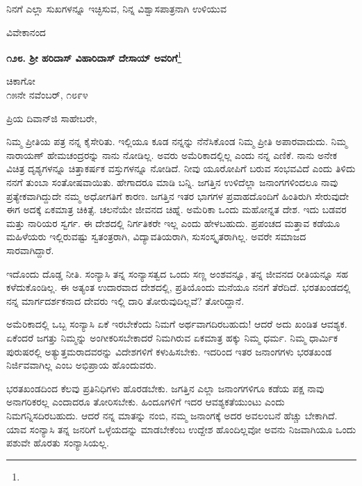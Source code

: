 \vspace{0.1cm}

ನಿನಗೆ ಎಲ್ಲಾ ಸುಖಗಳನ್ನೂ ಇಚ್ಛಿಸುವ, ನಿನ್ನ ವಿಶ್ವಾಸಪಾತ್ರನಾಗಿ ಉಳಿಯುವ

{\flushright
ವಿವೇಕಾನಂದ\par}

\eject

\begin{center}
\textbf{೧೨೮. ಶ‍್ರೀ ಹರಿದಾಸ್ ವಿಹಾರಿದಾಸ್ ದೇಸಾಯ್ ಅವರಿಗೆ}\footnote{}
\end{center}

\begin{flushright}
ಚಿಕಾಗೋ\\೧೫ನೇ ನವೆಂಬರ್, ೧೮೯೪
\end{flushright}

\noindent
ಪ್ರಿಯ ದಿವಾನ್‌ಜಿ ಸಾಹೇಬರೇ,

ನಿಮ್ಮ ಪ್ರೀತಿಯ ಪತ್ರ ನನ್ನ ಕೈಸೇರಿತು. ಇಲ್ಲಿಯೂ ಕೂಡ ನನ್ನನ್ನು ನೆನೆಸಿಕೊಂಡ ನಿಮ್ಮ ಪ್ರೀತಿ ಅಪಾರವಾದುದು. ನಿಮ್ಮ ನಾರಾಯಣ್ ಹೇಮಚಂದ್ರರನ್ನು ನಾನು ನೋಡಿಲ್ಲ. ಅವರು ಅಮೆರಿಕಾದಲ್ಲಿಲ್ಲ ಎಂದು ನನ್ನ ಎಣಿಕೆ. ನಾನು ಅನೇಕ ವಿಚಿತ್ರ ದೃಶ್ಯಗಳನ್ನೂ ಚಿತ್ತಾಕರ್ಷಕ ವಸ್ತುಗಳನ್ನೂ ನೋಡಿದೆ. ನೀವು ಯೂರೋಪಿಗೆ ಬರುವ ಸಂಭವವಿದೆ ಎಂದು ತಿಳಿದು ನನಗೆ ತುಂಬಾ ಸಂತೋಷವಾಯಿತು. ಹೇಗಾದರೂ ಮಾಡಿ ಬನ್ನಿ. ಜಗತ್ತಿನ ಉಳಿದೆಲ್ಲಾ ಜನಾಂಗಗಳಿಂದಲೂ ನಾವು ಪ್ರತ್ಯೇಕವಾಗಿದ್ದುದೇ ನಮ್ಮ ಅಧೋಗತಿಗೆ ಕಾರಣ. ಜಗತ್ತಿನ ಇತರ ಭಾಗಗಳ ಪ್ರವಾಹದೊಂದಿಗೆ ಹಿಂತಿರುಗಿ ಸೇರುವುದೇ ಈಗ ಅದಕ್ಕೆ ಏಕಮಾತ್ರ ಚಿಕಿತ್ಸೆ. ಚಲನೆಯೇ ಜೀವನದ ಚಿಹ್ನೆ. ಅಮೆರಿಕಾ ಒಂದು ಮಹೋನ್ನತ ದೇಶ. ಇದು ಬಡವರ ಮತ್ತು ನಾರಿಯರ ಸ್ವರ್ಗ. ಈ ದೇಶದಲ್ಲಿ ನಿರ್ಗತಿಕರೇ ಇಲ್ಲ ಎಂದು ಹೇಳಬಹುದು. ಪ್ರಪಂಚದ ಮತ್ತಾವ ಕಡೆಯೂ ಮಹಿಳೆಯರು ಇಲ್ಲಿರುವಷ್ಟು ಸ್ವತಂತ್ರರಾಗಿ, ವಿದ್ಯಾವತಿಯರಾಗಿ, ಸುಸಂಸ್ಕೃತರಾಗಿಲ್ಲ. ಅವರೇ ಸಮಾಜದ ಸಾರವಾಗಿದ್ದಾರೆ.

ಇದೊಂದು ದೊಡ್ಡ ನೀತಿ. ಸಂನ್ಯಾಸಿ ತನ್ನ ಸಂನ್ಯಾಸತ್ವದ ಒಂದು ಸಣ್ಣ ಅಂಶವನ್ನೂ, ತನ್ನ ಜೀವನದ ರೀತಿಯನ್ನೂ ಸಹ ಕಳೆದುಕೊಂಡಿಲ್ಲ. ಈ ಅತ್ಯಂತ ಉದಾರವಾದ ದೇಶದಲ್ಲಿ, ಪ್ರತಿಯೊಂದು ಮನೆಯೂ ನನಗೆ ತೆರೆದಿದೆ. ಭರತಖಂಡದಲ್ಲಿ ನನ್ನ ಮಾರ್ಗದರ್ಶಕನಾದ ದೇವರು ಇಲ್ಲಿ ದಾರಿ ತೋರುವುದಿಲ್ಲವೆ? ತೋರಿದ್ದಾನೆ.

ಅಮೆರಿಕಾದಲ್ಲಿ ಒಬ್ಬ ಸಂನ್ಯಾಸಿ ಏಕೆ ಇರಬೇಕೆಂದು ನಿಮಗೆ ಅರ್ಥವಾಗದಿರಬಹುದು! ಆದರೆ ಅದು ಖಂಡಿತ ಆವಶ್ಯಕ. ಏಕೆಂದರೆ ಜಗತ್ತು ನಿಮ್ಮನ್ನು ಅಂಗೀಕರಿಸಬೇಕಾದರೆ ನಿಮಗಿರುವ ಏಕಮಾತ್ರ ಹಕ್ಕು ನಿಮ್ಮ ಧರ್ಮ. ನಿಮ್ಮ ಧಾರ್ಮಿಕ ಪುರುಷರಲ್ಲಿ ಅತ್ಯುತ್ತಮರಾದವರನ್ನು ವಿದೇಶಗಳಿಗೆ ಕಳುಹಿಸಬೇಕು. ಇದರಿಂದ ಇತರ ಜನಾಂಗಗಳು ಭರತಖಂಡ ನಿರ್ಜಿವವಾಗಿಲ್ಲ ಎಂಬ ಅಭಿಪ್ರಾಯ ಹೊಂದುವರು.

ಭರತಖಂಡದಿಂದ ಕೆಲವು ಪ್ರತಿನಿಧಿಗಳು ಹೊರಡಬೇಕು. ಜಗತ್ತಿನ ಎಲ್ಲಾ ಜನಾಂಗಗಳಿಗೂ ಕಡೆಯ ಪಕ್ಷ ನಾವು ಅನಾಗರಿಕರಲ್ಲ ಎಂದಾದರೂ ತೋರಿಸಬೇಕು. ಹಿಂದೂಗಳಿಗೆ ಇದರ ಆವಶ್ಯಕತೆಯುಂಟು ಎಂದು ನಿಮಗನ್ನಿಸದಿರಬಹುದು. ಆದರೆ ನನ್ನ ಮಾತನ್ನು ನಂಬಿ, ನಮ್ಮ ಜನಾಂಗಕ್ಕೆ ಅದರ ಅವಲಂಬನೆ ಹೆಚ್ಚು ಬೇಕಾಗಿದೆ. ಯಾವ ಸಂನ್ಯಾಸಿ ತನ್ನ ಜನರಿಗೆ ಒಳ್ಳೆಯದನ್ನು ಮಾಡಬೇಕೆಂಬ ಉದ್ದೇಶ ಹೊಂದಿಲ್ಲವೋ ಅವನು ನಿಜವಾಗಿಯೂ ಒಂದು ಪಶುವೇ ಹೊರತು ಸಂನ್ಯಾಸಿಯಲ್ಲ.

